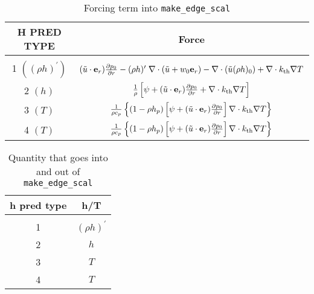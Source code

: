 \begin{table*}[h]
\begin{center}
\caption{Forcing term into {\tt make\_edge\_scal} \newline}
\begin{tabular}{c|c}
\hline
\hline
{H PRED TYPE} &   {Force} \\
\hline \\[-3mm]
1  $((\rho h)^\prime)$ &  $(\tilde{u} \cdot \mathbf{e}_r) \frac{\partial p_0}{\partial r} - 
 (\rho h)^\prime \; \nabla \cdot (\tilde{u}+w_0 \mathbf{e}_r) - 
 \nabla \cdot (\tilde{u} (\rho h)_0) + \nabla \cdot k_{\rm th} \nabla T$ \\[2 mm]
2  $(h)$ & $\frac{1}{\rho} \left [\psi + (\tilde{u} \cdot \mathbf{e}_r)
  \frac{\partial p_0}{\partial r} + \nabla \cdot k_{\rm th} \nabla T \right ]$ \\[2 mm]
3  $(T)$ & $\frac{1}{\rho c_p} \left \{ (1 - \rho h_p) 
   \left [\psi + (\tilde{u} \cdot \mathbf{e}_r) \frac{\partial p_0}{\partial r} \right ] \nabla \cdot k_{\rm th} \nabla T \right \}$ \\[2 mm]
4  $(T)$ & $\frac{1}{\rho c_p} \left\{ (1 - \rho h_p) \left [\psi + (\tilde{u} \cdot \mathbf{e}_r)
\frac{\partial p_0}{\partial r}\right ] \nabla \cdot k_{\rm th} \nabla T \right\}$ \\[2 mm]
\hline
\end{tabular}
\end{center}
\end{table*}

\begin{table*}[h]
\begin{center}
\caption{Quantity that goes into and out of {\tt make\_edge\_scal} \newline}
\begin{tabular}{c|c}
\hline
\hline
{h pred type} & {h/T } \\
\hline \\[-3mm]
1 & $(\rho h)^\prime$ \\
2 & $h$  \\
3 & $T$  \\
4 & $T$  \\
\hline
\end{tabular}
\end{center}
\end{table*}

